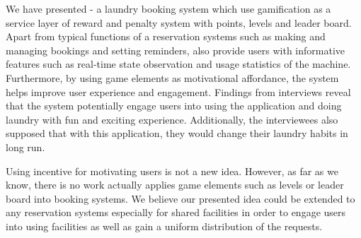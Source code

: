 We have presented {\toolname} - a laundry booking system which use gamification as a service layer of reward and penalty system with points, levels and leader board. Apart from typical functions of a reservation systems such as making and managing bookings and setting reminders, {\toolname} also provide users with informative features such as real-time state observation and usage statistics of the machine. Furthermore, by using game elements as motivational affordance, the system helps improve user experience and engagement. Findings from interviews reveal that the system potentially engage users into using the application and doing laundry with fun and exciting experience. Additionally, the interviewees also supposed that with this application, they would change their laundry habits in long run.

Using incentive for motivating users is not a new idea. However, as far as we know, there is no work actually applies game elements such as levels or leader board into booking systems. We believe our presented idea could be extended to any reservation systems especially for shared facilities in order to engage users into using facilities as well as gain a uniform distribution of the requests.